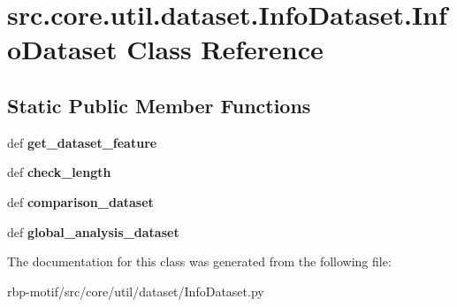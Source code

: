 \hypertarget{classsrc_1_1core_1_1util_1_1dataset_1_1InfoDataset_1_1InfoDataset}{\section{src.\-core.\-util.\-dataset.\-Info\-Dataset.\-Info\-Dataset Class Reference}
\label{classsrc_1_1core_1_1util_1_1dataset_1_1InfoDataset_1_1InfoDataset}
}
\subsection*{Static Public Member Functions}
\begin{DoxyCompactItemize}
\item 
\hypertarget{classsrc_1_1core_1_1util_1_1dataset_1_1InfoDataset_1_1InfoDataset_a7fb531ab9e97f87deb649e5066f73680}{def {\bfseries get\-\_\-dataset\-\_\-feature}}\label{classsrc_1_1core_1_1util_1_1dataset_1_1InfoDataset_1_1InfoDataset_a7fb531ab9e97f87deb649e5066f73680}

\item 
\hypertarget{classsrc_1_1core_1_1util_1_1dataset_1_1InfoDataset_1_1InfoDataset_aa17b02ebb653e27a737746f36e201329}{def {\bfseries check\-\_\-length}}\label{classsrc_1_1core_1_1util_1_1dataset_1_1InfoDataset_1_1InfoDataset_aa17b02ebb653e27a737746f36e201329}

\item 
\hypertarget{classsrc_1_1core_1_1util_1_1dataset_1_1InfoDataset_1_1InfoDataset_aed2df9b2fba173f23b7cbd1187c9c42f}{def {\bfseries comparison\-\_\-dataset}}\label{classsrc_1_1core_1_1util_1_1dataset_1_1InfoDataset_1_1InfoDataset_aed2df9b2fba173f23b7cbd1187c9c42f}

\item 
\hypertarget{classsrc_1_1core_1_1util_1_1dataset_1_1InfoDataset_1_1InfoDataset_a839ef0f3ae011b5875439d0193ce063c}{def {\bfseries global\-\_\-analysis\-\_\-dataset}}\label{classsrc_1_1core_1_1util_1_1dataset_1_1InfoDataset_1_1InfoDataset_a839ef0f3ae011b5875439d0193ce063c}

\end{DoxyCompactItemize}


The documentation for this class was generated from the following file\-:\begin{DoxyCompactItemize}
\item 
rbp-\/motif/src/core/util/dataset/Info\-Dataset.\-py\end{DoxyCompactItemize}
